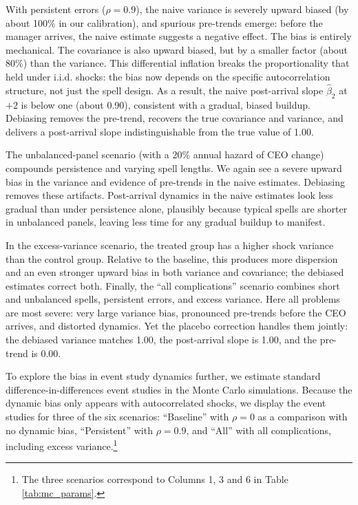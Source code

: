 \documentclass[11pt,a4paper]{article}
\begin{document}
With persistent errors ($\rho=0.9$), the naive variance is severely upward biased (by about 100\% in our calibration), and spurious pre-trends emerge: before the manager arrives, the naive estimate suggests a negative effect. The bias is entirely mechanical. The covariance is also upward biased, but by a smaller factor (about 80\%) than the variance. This differential inflation breaks the proportionality that held under i.i.d. shocks: the bias now depends on the specific autocorrelation structure, not just the spell design. As a result, the naive post-arrival slope $\hat\beta_2$ at $+2$ is below one (about 0.90), consistent with a gradual, biased buildup. Debiasing removes the pre-trend, recovers the true covariance and variance, and delivers a post-arrival slope indistinguishable from the true value of 1.00.

The unbalanced-panel scenario (with a 20\% annual hazard of CEO change) compounds persistence and varying spell lengths. We again see a severe upward bias in the variance and evidence of pre-trends in the naive estimates. Debiasing removes these artifacts. Post-arrival dynamics in the naive estimates look less gradual than under persistence alone, plausibly because typical spells are shorter in unbalanced panels, leaving less time for any gradual buildup to manifest.

In the excess-variance scenario, the treated group has a higher shock variance than the control group. Relative to the baseline, this produces more dispersion and an even stronger upward bias in both variance and covariance; the debiased estimates correct both. Finally, the ``all complications'' scenario combines short and unbalanced spells, persistent errors, and excess variance. Here all problems are most severe: very large variance bias, pronounced pre-trends before the CEO arrives, and distorted dynamics. Yet the placebo correction handles them jointly: the debiased variance matches 1.00, the post-arrival slope is 1.00, and the pre-trend is 0.00. 

To explore the bias in event study dynamics further, we estimate standard difference-in-differences event studies \citep{Callaway2021JoLE} in the Monte Carlo simulations. Because the dynamic bias only appears with autocorrelated shocks, we display the event studies for three of the six scenarios: ``Baseline'' with $\rho=0$ as a comparison with no dynamic bias, ``Persistent'' with $\rho=0.9$, and ``All'' with all complications, including excess variance.\footnote{The three scenarios correspond to Columns 1, 3 and 6 in Table \ref{tab:mc_params}.}
\end{document}
